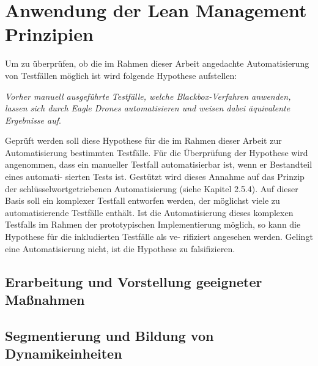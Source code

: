 \section{Anwendung der Lean Management Prinzipien}
Um zu überprüfen, ob die im Rahmen dieser Arbeit angedachte Automatisierung von Testfällen möglich ist wird folgende Hypothese aufstellen: 

\textit{Vorher manuell ausgeführte Testfälle, welche Blackbox-Verfahren anwenden, lassen sich durch Eagle Drones automatisieren und weisen dabei äquivalente Ergebnisse auf}. 

Geprüft werden soll diese Hypothese für die im Rahmen dieser Arbeit zur Automatisierung bestimmten Testfälle. Für die Überprüfung der Hypothese wird angenommen, dass ein manueller Testfall automatisierbar ist, wenn er Bestandteil eines automati- sierten Tests ist. Gestützt wird dieses Annahme auf das Prinzip der schlüsselwortgetriebenen Automatisierung (siehe Kapitel 2.5.4). Auf dieser Basis soll ein komplexer Testfall entworfen werden, der möglichst viele zu automatisierende Testfälle enthält. Ist die Automatisierung dieses komplexen Testfalls im Rahmen der prototypischen Implementierung möglich, so kann die Hypothese für die inkludierten Testfälle als ve- rifiziert angesehen werden. Gelingt eine Automatisierung nicht, ist die Hypothese zu falsifizieren.

\subsection{Erarbeitung und Vorstellung geeigneter Maßnahmen}

\subsection{Segmentierung und Bildung von Dynamikeinheiten}

